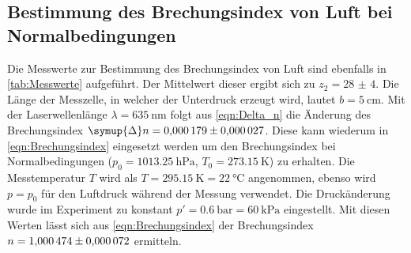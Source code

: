 \subsection{Bestimmung des Brechungsindex von Luft bei Normalbedingungen}
\label{subsec:A_Index_Luft}
Die Messwerte zur Bestimmung des Brechungsindex von Luft sind ebenfalls in \autoref{tab:Messwerte} aufgeführt. Der Mittelwert dieser ergibt sich zu $z_2 = \num{28(4)}$.
Die Länge der Messzelle, in welcher der Unterdruck erzeugt wird, lautet $b = \qty{5}{\centi\metre}$. Mit der Laserwellenlänge $\lambda = \qty{635}{\nano\metre}$ folgt aus
\autoref{eqn:Delta_n} die Änderung des Brechungsindex $\symup{\Delta}n = \num{0.000179+-0.000027}$. Diese kann wiederum in \autoref{eqn:Brechungsindex} eingesetzt werden um den
Brechungsindex bei Normalbedingungen ($p_0 = \qty{1013.25}{\hecto\pascal}$, $T_0 = \qty{273.15}{\kelvin}$) zu erhalten. Die Messtemperatur $T$ wird als 
$T = \qty{295.15}{\kelvin} = \qty{22}{\celsius}$ angenommen, ebenso wird $p = p_0$ für den Luftdruck während der Messung verwendet. Die Druckänderung wurde im Experiment zu 
konstant $p' = \qty{0.6}{\bar} = \qty{60}{\kilo\pascal}$ eingestellt. Mit diesen Werten lässt sich aus \autoref{eqn:Brechungsindex} der Brechungsindex
$n = \num{1.000474+-0.000072}$ ermitteln.
